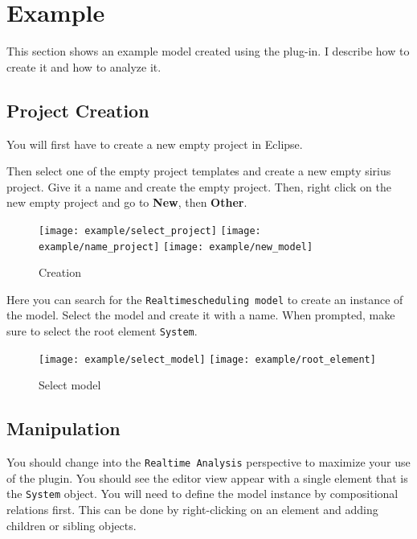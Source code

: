 \pagebreak
\section{Example}\label{example}
This section shows an example model created using the plug-in. I describe
how to create it and how to analyze it.
\subsection{Project Creation}
You will first have to create a new empty project in Eclipse.


Then select one of the empty project templates and create
a new empty sirius project. Give it a name and create the
empty project. Then, right click on the new empty project
and go to \textbf{New}, then \textbf{Other}. 
\begin{figure}[H]
    \centering
    \texttt{[image: example/select\_project]}
    \texttt{[image: example/name\_project]}
    \texttt{[image: example/new\_model]}
    \caption{Creation}
\end{figure}

Here you can search for the \texttt{Realtimescheduling model} to create
an instance of the model. Select the model and create it with a name.
When prompted, make sure to select the root element \texttt{System}.
\begin{figure}[H]
    \centering
    \texttt{[image: example/select\_model]}
    \texttt{[image: example/root\_element]}
    \caption{Select model}
\end{figure}

\subsection{Manipulation}
You should change into the \texttt{Realtime Analysis} perspective to
maximize your use of the plugin. You should see the editor view appear
with a single element that is the \texttt{System} object. You will need
to define the model instance by compositional relations first. This
can be done by right-clicking on an element and adding children or sibling
objects.

